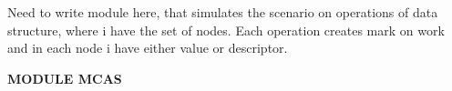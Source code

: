 \appendix
\label{sec:appendix}

\begin{BLACKSHEET}

Need to write module here, that simulates the scenario on operations of data structure, where i have the set of nodes. Each operation creates mark on work and in each node i have either value or descriptor.

\textbf{MODULE MCAS}

\end{BLACKSHEET}
